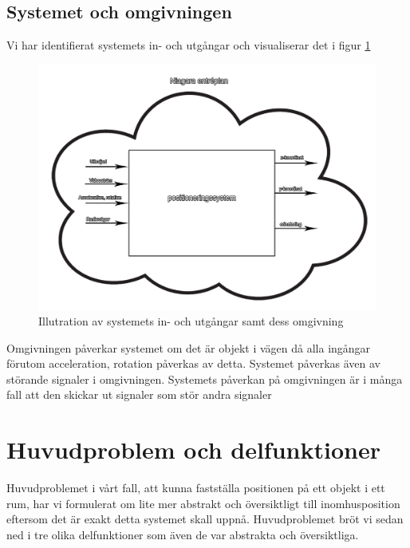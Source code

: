 \documentclass[11pt, a4paper]{report}
\begin{document}
\subsection{Systemet och omgivningen}
Vi har identifierat systemets in- och utgångar och visualiserar det i figur \ref{fig:system-omgivning}
\begin{figure}[H]
	\begin{center}
		\includegraphics [width=12cm,angle=0]{system-omgivning.png}
		\caption{Illutration av systemets in- och utgångar samt dess omgivning}
		\label{fig:system-omgivning}
	\end{center}
\end{figure}

Omgivningen påverkar systemet om det är objekt i vägen då alla ingångar förutom acceleration, rotation påverkas av detta. Systemet påverkas även av störande signaler i omgivningen. Systemets påverkan på omgivningen är i många fall att den skickar ut signaler som stör andra signaler

\clearpage


\section{Huvudproblem och delfunktioner}

Huvudproblemet i vårt fall, att kunna fastställa positionen på ett objekt i ett rum, har vi formulerat om lite mer abstrakt och översiktligt till inomhusposition eftersom det är exakt detta systemet skall uppnå. Huvudproblemet bröt vi sedan ned i tre olika delfunktioner som även de var abstrakta och översiktliga.
\end{document}
